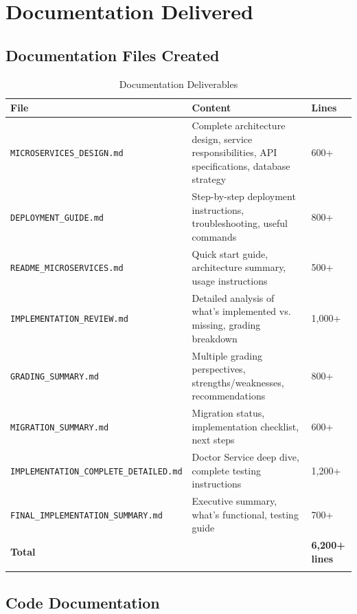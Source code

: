 \documentclass[12pt,a4paper]{article}
\begin{document}
\section{Documentation Delivered}

\subsection{Documentation Files Created}

\begin{longtable}{@{}lp{8cm}l@{}}
\toprule
\textbf{File} & \textbf{Content} & \textbf{Lines} \\
\midrule
\endhead

\texttt{MICROSERVICES\_DESIGN.md} & Complete architecture design, service responsibilities, API specifications, database strategy & 600+ \\

\texttt{DEPLOYMENT\_GUIDE.md} & Step-by-step deployment instructions, troubleshooting, useful commands & 800+ \\

\texttt{README\_MICROSERVICES.md} & Quick start guide, architecture summary, usage instructions & 500+ \\

\texttt{IMPLEMENTATION\_REVIEW.md} & Detailed analysis of what's implemented vs. missing, grading breakdown & 1,000+ \\

\texttt{GRADING\_SUMMARY.md} & Multiple grading perspectives, strengths/weaknesses, recommendations & 800+ \\

\texttt{MIGRATION\_SUMMARY.md} & Migration status, implementation checklist, next steps & 600+ \\

\texttt{IMPLEMENTATION\_COMPLETE\_DETAILED.md} & Doctor Service deep dive, complete testing instructions & 1,200+ \\

\texttt{FINAL\_IMPLEMENTATION\_SUMMARY.md} & Executive summary, what's functional, testing guide & 700+ \\

\midrule
\textbf{Total} & & \textbf{6,200+ lines} \\
\bottomrule
\caption{Documentation Deliverables}
\end{longtable}

\subsection{Code Documentation}
\end{document}
